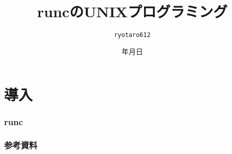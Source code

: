 \documentclass[unicode, 14pt, aspectratio=169]{beamer}
\date{\number\year 年\number\month 月\number\day 日}
\title{runcのUNIXプログラミング}
\author{\texttt{ryotaro612}}
\begin{document}
\begin{frame}
\titlepage
\end{frame}
\section{導入}
\begin{frame}[t]
  \frametitle{runc}
\end{frame}
\begin{frame}[allowframebreaks,t]
  \frametitle{参考資料}  
  \printbibliography
\end{frame}
\end{document}
